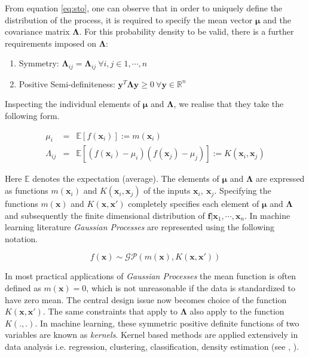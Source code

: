 \documentclass[referee,a4paper,12pt,traditabstract]{swsc}
\begin{document}
\begin{linenumbers}
From equation \ref{eq:sto}, one can observe that in order to uniquely define the distribution of the process, it is required to specify the mean vector $\mathbf{\mu}$ and the covariance matrix $\mathbf{\Lambda}$. For this probability density to be valid, there is a further requirements imposed on $\mathbf{\Lambda}$: 

\begin{enumerate}
      \item Symmetry: $\mathbf{\Lambda}_{ij} = \mathbf{\Lambda}_{ij} \ \forall i,j \in {1, \cdots, n} $ 
      \item Positive Semi-definiteness: $\mathbf{y}^T \mathbf{\Lambda} \mathbf{y} \geq 0 \ \forall \mathbf{y} \in \mathbb{R}^n$  
\end{enumerate}

Inspecting the individual elements of $\mathbf{\mu}$ and $\mathbf{\Lambda}$, we realise that they take the following form.

\begin{eqnarray}
      \mu_i & = & \mathbb{E}[f(\mathbf{x}_i)] := m(\mathbf{x}_i) \\
      \Lambda_{ij} & = & \mathbb{E}[(f(\mathbf{x}_i) - \mu_i)(f(\mathbf{x}_j) - \mu_j)] := K(\mathbf{x}_i, \mathbf{x}_j)
\end{eqnarray}

Here $\mathbb{E}$ denotes the expectation (average). The elements of $\mathbf{\mu}$ and $\mathbf{\Lambda}$ are expressed as functions $m(\mathbf{x}_i)$ and $K(\mathbf{x}_i, \mathbf{x}_j)$ of the inputs $\mathbf{x}_i,\ \mathbf{x}_j$. Specifying the functions $m(\mathbf{x})$ and $K(\mathbf{x}, \mathbf{x}')$ completely specifies each element of $\mathbf{\mu}$ and $\mathbf{\Lambda}$ and subsequently the finite dimensional distribution of $\mathbf{f} | \mathbf{x}_1, \cdots, \mathbf{x}_n $. In machine learning literature \emph{Gaussian Processes} are represented using the following notation.

\begin{equation}
    f(\mathbf{x}) \sim \mathcal{GP}(m(\mathbf{x}), K(\mathbf{x}, \mathbf{x}'))
\end{equation}

In most practical applications of \emph{Gaussian Processes} the mean function is often defined as $m(\mathbf{x}) = 0$, which is not unreasonable if the data is standardized to have zero mean. The central design issue now becomes choice of the function $K(\mathbf{x}, \mathbf{x}')$. The same constraints that apply to $\mathbf{\Lambda}$ also apply to the function $K(.,.)$. In machine learning, these symmetric positive definite functions of two variables are known as \emph{kernels}. Kernel based methods are applied extensively in data analysis i.e. regression, clustering, classification, density estimation (see \citet{Scholkopf:2001:LKS:559923}, \citet{hofmann2008}).


\end{linenumbers}
\end{document}
